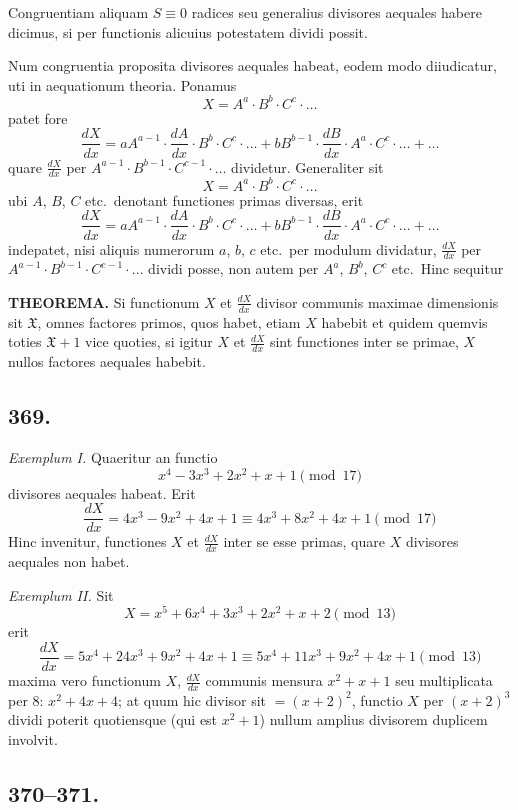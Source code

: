 \documentclass[12pt]{article}
\begin{document}
Congruentiam aliquam $S\equiv 0$ radices seu generalius divisores aequales habere dicimus, si per functionis alicuius potestatem dividi possit.

Num congruentia proposita divisores aequales habeat, eodem modo diiudicatur, uti in aequationum theoria. Ponamus
\[
X = A^a\cdot B^b\cdot C^c\cdot \ldots
\]
patet fore
\[
\frac{dX}{dx} = aA^{a-1}\cdot\frac{dA}{dx}\cdot B^b\cdot C^c\cdot\ldots + bB^{b-1}\cdot\frac{dB}{dx}\cdot A^a\cdot C^c\cdot\ldots + \ldots
\]
quare $\frac{dX}{dx}$ per $A^{a-1}\cdot B^{b-1}\cdot C^{c-1}\cdot\ldots$ dividetur. Generaliter sit
\[
X = A^a\cdot B^b\cdot C^c\cdot\ldots
\]
ubi $A$, $B$, $C$ etc.~denotant functiones primas diversas, erit
\[
\frac{dX}{dx} = aA^{a-1}\cdot\frac{dA}{dx}\cdot B^b\cdot C^c\cdot\ldots + bB^{b-1}\cdot\frac{dB}{dx}\cdot A^a\cdot C^c\cdot\ldots + \ldots
\]
indepatet, nisi aliquis numerorum $a$, $b$, $c$ etc.~per modulum dividatur, $\frac{dX}{dx}$ per $A^{a-1}\cdot B^{b-1}\cdot C^{c-1}\cdot\ldots$ dividi posse, non autem per $A^a$, $B^b$, $C^c$ etc.~Hinc sequitur

\textbf{THEOREMA.} Si functionum $X$ et $\frac{dX}{dx}$ divisor communis maximae dimensionis sit $\mathfrak{X}$, omnes factores primos, quos habet, etiam $X$ habebit et quidem quemvis toties $\mathfrak{X}+1$ vice quoties, si igitur $X$ et $\frac{dX}{dx}$ sint functiones inter se primae, $X$ nullos factores aequales habebit.

\subsection*{369.}

\textit{Exemplum I.} Quaeritur an functio
\[
x^4-3x^3+2x^2+x+1 \pmod{17}
\]
divisores aequales habeat. Erit
\[
\frac{dX}{dx} = 4x^3-9x^2+4x+1 \equiv 4x^3+8x^2+4x+1 \pmod{17}
\]
Hinc invenitur, functiones $X$ et $\frac{dX}{dx}$ inter se esse primas, quare $X$ divisores aequales non habet.

\textit{Exemplum II.} Sit
\[
X = x^5+6x^4+3x^3+2x^2+x+2 \pmod{13}
\]
erit
\[
\frac{dX}{dx} = 5x^4+24x^3+9x^2+4x+1 \equiv 5x^4+11x^3+9x^2+4x+1 \pmod{13}
\]
maxima vero functionum $X$, $\frac{dX}{dx}$ communis mensura $x^2+x+1$ seu multiplicata per $8$: $x^2+4x+4$; at quum hic divisor sit $=(x+2)^2$, functio $X$ per $(x+2)^3$ dividi poterit quotiensque (qui est $x^2+1$) nullum amplius divisorem duplicem involvit.

\subsection*{370--371.}
\end{document}
